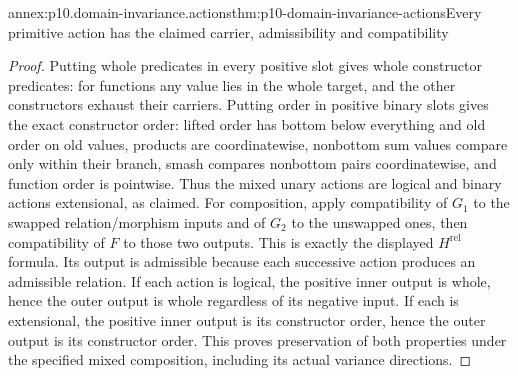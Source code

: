 \begin{annexitem}{annex:p10.domain-invariance.actions}{thm:p10-domain-invariance-actions}{Every primitive action has the claimed carrier, admissibility and compatibility}
\begin{proof}
Putting whole predicates in every positive slot gives whole
constructor predicates: for functions any value lies in the
whole target, and the other constructors exhaust their carriers.
Putting order in positive binary slots gives the exact
constructor order: lifted order has bottom below everything
and old order on old values, products are coordinatewise,
nonbottom sum values compare only within their branch,
smash compares nonbottom pairs coordinatewise, and function
order is pointwise. Thus the mixed unary actions are logical
and binary actions extensional, as claimed.
For composition, apply compatibility of \(G_1\) to the
swapped relation/morphism inputs and of \(G_2\) to the
unswapped ones, then compatibility of \(F\) to those two
outputs. This is exactly the displayed \(H^{\mathrm{rel}}\)
formula. Its output is admissible because each successive
action produces an admissible relation. If each action is
logical, the positive inner output is whole, hence the outer
output is whole regardless of its negative input. If each
is extensional, the positive inner output is its constructor
order, hence the outer output is its constructor order.
This proves preservation of both properties under the specified
mixed composition, including its actual variance directions.
\end{proof}
\end{annexitem}

